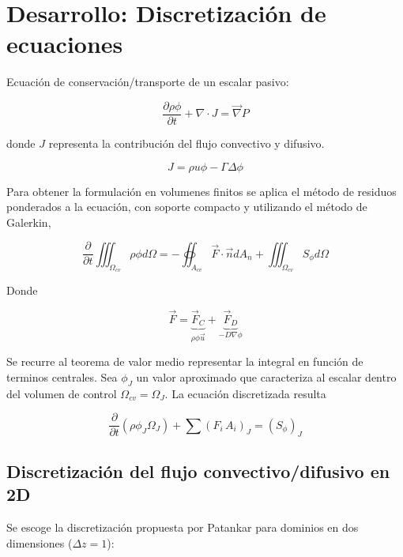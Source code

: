 \section{Desarrollo: Discretización de ecuaciones}

Ecuación de conservación/transporte de un escalar pasivo:

\begin{equation} \label{transporte}
\dfrac{\partial \rho \phi}{\partial t} + \nabla \cdot J = \vec{\nabla} P 
\end{equation}

donde $J$ representa la contribución del flujo convectivo y difusivo.

\begin{equation}
J = \rho u \phi - \Gamma \Delta \phi
\end{equation}

Para obtener la formulación en volumenes finitos se aplica el método de residuos ponderados a la ecuación, con soporte compacto y utilizando el método de Galerkin,

\begin{equation}\dfrac{\partial}{\partial t} \iiint_{\Omega_{cv}} \rho \phi d \Omega = - \oiint_{A_{cv}} \vec{F} \cdot \vec{n} d A_n + \iiint_{\Omega_{cv}} S_{\phi} d \Omega
\end{equation}  

Donde

\begin{equation}
\vec{F} = \underbrace{\vec{F}_C}_{\rho \phi \vec{u}} + \underbrace{\vec{F}_D}_{-D \nabla \phi}
\end{equation}

Se recurre al teorema de valor medio representar la integral en función de terminos centrales. Sea $\phi_J$ un valor aproximado que caracteriza al escalar dentro del volumen de control $\Omega_{cv} = \Omega_J$. La ecuación discretizada resulta

\begin{equation}
\dfrac{\partial}{\partial t} \left( \rho \phi_J \Omega_J \right) + \sum \left( F_i \, A_i \right)_J = \left( S_{\phi} \right)_J
\end{equation} 

\subsection{Discretización del flujo convectivo/difusivo en 2D}

Se escoge la discretización propuesta por Patankar \cite{patankar} para dominios en dos dimensiones ($\Delta z = 1$):

